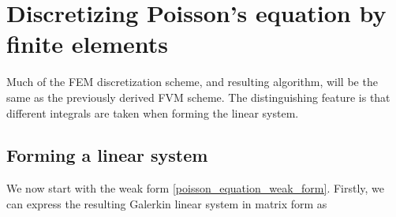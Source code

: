 % 
% 

\section{Discretizing Poisson's equation by finite elements}
Much of the FEM discretization scheme, and resulting algorithm, will be the same as the previously derived FVM scheme.
The distinguishing feature is that different integrals are taken when forming the linear system.
\subsection{Forming a linear system}
We now start with the weak form \eqref{poisson_equation_weak_form}.
Firstly, we can express the resulting Galerkin linear system in matrix form as

